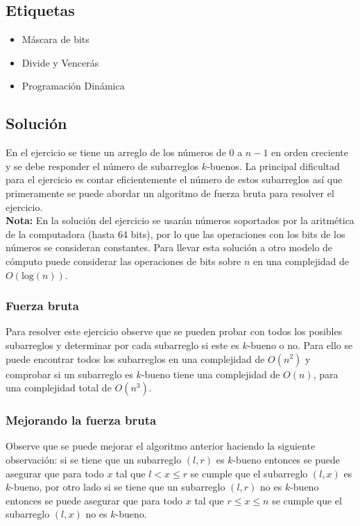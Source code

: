 \documentclass{article}
\begin{document}
\subsection{Etiquetas}

\begin{itemize}
    \item Máscara de bits
    \item Divide y Vencerás
    \item Programación Dinámica
\end{itemize}

\subsection{Solución}

En el ejercicio se tiene un arreglo de los números de 0 a $n-1$ en orden creciente y se debe responder el número de subarreglos
$k$-buenos. La principal dificultad para el ejercicio es contar eficientemente el número de estos subarreglos así que primeramente
se puede abordar un algoritmo de fuerza bruta para resolver el ejercicio.\\

\textbf{Nota:} En la solución del ejercicio se usarán números soportados por la aritmética de la computadora (hasta 64 bits),
por lo que las operaciones con los bits de los números se consideran constantes. Para llevar esta solución a otro modelo de cómputo
puede considerar las operaciones de bits sobre $n$ en una complejidad de $O(\text{log}(n))$.

\subsubsection{Fuerza bruta}

Para resolver este ejercicio observe que se pueden probar con todos los posibles subarreglos y determinar por cada subarreglo
si este es $k$-bueno o no. Para ello se puede encontrar todos los subarreglos en una complejidad de $O(n^2)$ y comprobar si un
subarreglo es $k$-bueno tiene una complejidad de $O(n)$, para una complejidad total de $O(n^3)$.

\subsubsection{Mejorando la fuerza bruta}

Observe que se puede mejorar el algoritmo anterior haciendo la siguiente observación: si se tiene que un subarreglo $(l,r)$ es $k$-bueno
entonces se puede asegurar que para todo $x$ tal que $l<x\leq r$ se cumple que el subarreglo $(l,x)$ es $k$-bueno, por otro lado si se
tiene que un subarreglo $(l,r)$ no es $k$-bueno entonces se puede asegurar que para todo $x$ tal que $r\leq x\leq n$ se cumple que el subarreglo
$(l,x)$ no es $k$-bueno.
\end{document}
